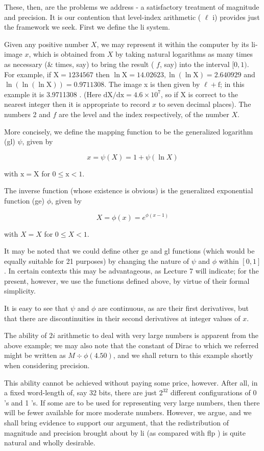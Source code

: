 \documentclass[10pt]{article}
\begin{document}
These, then, are the problems we address - a satisfactory treatment of magnitude and precision. It is our contention that level-index arithmetic ( $\ell$ i) provides just the framework we seek. First we define the li system.

Given any positive number $X$, we may represent it within the computer by its li-image $x$, which is obtained from $X$ by taking natural logarithms as many times as necessary (\& times, say) to bring the result ( $f$, say) into the interval $[0,1)$. For example, if $\mathrm{X}=1234567$ then $\ln \mathrm{X}=14.02623, \ln (\ln \mathrm{X})=2.640929$ and $\ln (\ln (\ln \mathrm{X}))=0.9711308$. The image x is then given by $\ell+\mathrm{f}$; in this example it is 3.9711308 . (Here $\mathrm{dX} / \mathrm{dx}=4.6 \times 10^{7}$, so if X is correct to the nearest integer then it is appropriate to record $x$ to seven decimal places). The numbers 2 and $f$ are the level and the index respectively, of the number $X$.

More concisely, we define the mapping function to be the generalized logarithm (gl) $\psi$, given by

$$
x=\psi(X)=1+\psi(\ln X)
$$

with $\mathrm{x}=\mathrm{X}$ for $0 \leqslant \mathrm{x}<1$.

The inverse function (whose existence is obvious) is the generalized exponential function (ge) $\phi$, given by

$$
X=\phi(x)=e^{\phi(x-1)}
$$

with $X=X$ for $0 \leqslant X<1$.

It may be noted that we could define other ge and gl functions (which would be equally suitable for 21 purposes) by changing the nature of $\psi$ and $\phi$ within $[0,1]$. In certain contexts this may be advantageous, as Lecture 7 will indicate; for the present, however, we use the functions defined above, by virtue of their formal simplicity.

It is easy to see that $\psi$ and $\phi$ are continuous, as are their first derivatives, but that there are discontinuities in their second derivatives at integer values of $x$.

The ability of $2 i$ arithmetic to deal with very large numbers is apparent from the above example; we may also note that the constant of Dirac to which we referred might be written as $M \div \phi(4.50)$, and we shall return to this example shortly when considering precision.

This ability cannot be achieved without paying some price, however. After all, in a fixed word-length of, say 32 bits, there are just $2^{32}$ different configurations of 0 's and 1 's. If some are to be used for representing very large numbers, then there will be fewer available for more moderate numbers. However, we argue, and we shall bring evidence to support our argument, that the redistribution of magnitude and precision brought about by li (as compared with flp ) is quite natural and wholly desirable.
\end{document}
